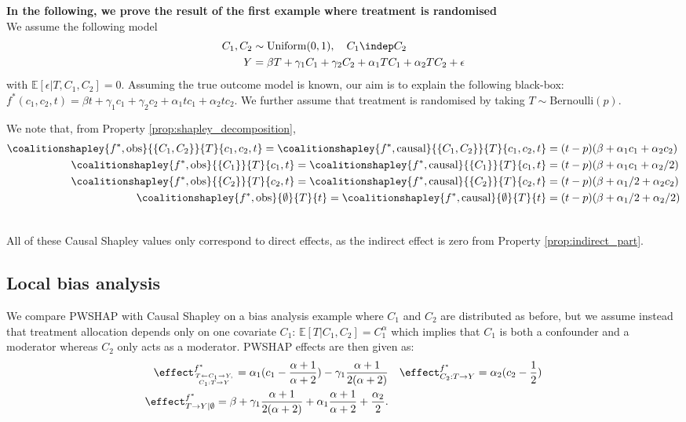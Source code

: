 \textbf{In the following, we prove the result of the first example where treatment is randomised} \\
We assume the following model
\begin{align*}
    C_1, C_2 &\sim \text{Uniform}(0,1), \ \ \ C_1 \indep C_2 \\
    Y &= \beta T + \gamma_1C_1 + \gamma_2C_2 + \alpha_1TC_1 + \alpha_2TC_2 + \epsilon
\end{align*}
with $\mathbb{E}[\epsilon|T,C_1,C_2] = 0$. Assuming the true outcome model is known, our aim is to explain the following black-box: $f^*(c_1, c_2, t) = \beta t + \gamma_1c_1 + \gamma_2c_2 + \alpha_1tc_1 + \alpha_2tc_2$. We further assume that treatment is randomised by taking $T \sim \text{Bernoulli}(p)$.

We note that, from Property \ref{prop:shapley_decomposition},
\begin{align*}
\coalitionshapley{f^*,\text{obs}}{\{C_1,C_2\}}{T}{c_1,c_2,t} = \coalitionshapley{f^*,\text{causal}}{\{C_1,C_2\}}{T}{c_1,c_2,t}  &= (t - p)(\beta + \alpha_1c_1 + \alpha_2c_2) \\
    \coalitionshapley{f^*,\text{obs}}{\{C_1\}}{T}{c_1,t} = \coalitionshapley{f^*,\text{causal}}{\{C_1\}}{T}{c_1,t} &= (t - p)(\beta + \alpha_1c_1 + \alpha_2/2) \\
    \coalitionshapley{f^*,\text{obs}}{\{C_2\}}{T}{c_2,t} = \coalitionshapley{f^*,\text{causal}}{\{C_2\}}{T}{c_2,t} &= (t - p)(\beta + \alpha_1/2 + \alpha_2c_2) \\
    \coalitionshapley{f^*,\text{obs}}{\emptyset}{T}{t} = \coalitionshapley{f^*,\text{causal}}{\emptyset}{T}{t} &= (t - p)(\beta + \alpha_1/2 + \alpha_2/2) \\ \\
\end{align*}


All of these Causal Shapley values only correspond to direct effects, as the indirect effect is zero from Property \ref{prop:indirect_part}.

\subsection{Local bias analysis}
\label{subsec:local_bias}

We compare PWSHAP with Causal Shapley on a bias analysis example where $C_1$ and $C_2$ are distributed as before, but we assume instead that treatment allocation depends only on one covariate $C_1$: $\mathbb{E}[T|C_1,C_2] = C_1^\alpha$ which implies that $C_1$ is both a confounder and a moderator whereas $C_2$ only acts as a moderator. PWSHAP effects are then given as:
\begin{align*}
\effect^{f^*}_{T \leftarrow C_1 \rightarrow Y, \atop C_1: T \rightarrow Y} = \alpha_1(c_1 - \frac{\alpha+1}{\alpha+2}) - \gamma_1\frac{\alpha+1}{2(\alpha+2)}             &  &\effect^{f^*}_{C_2: T \rightarrow Y} = \alpha_2(c_2 - \frac{1}{2})              \\
\effect^{f^*}_{T \rightarrow Y | \emptyset} = \beta + \gamma_1\frac{\alpha+1}{2(\alpha + 2)} + \alpha_1\frac{\alpha+1}{\alpha+2} + \frac{\alpha_2}{2}.          &  & 
\end{align*}

